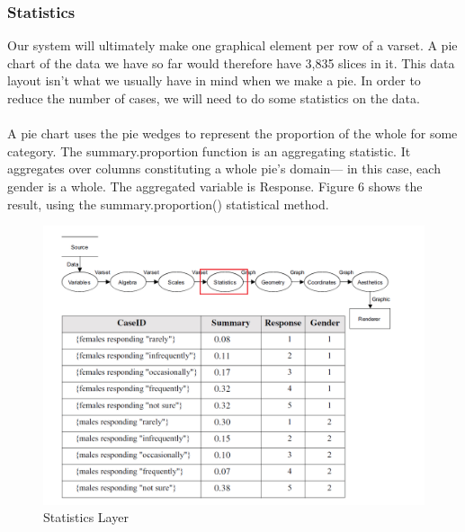 \documentclass[12pt]{article}
\begin{document}
\subsubsection{Statistics}
Our system will ultimately make one graphical element per row of a varset. A
pie chart of the data we have so far would therefore have 3,835 slices in it. This
data layout isn't what we usually have in mind when we make a pie. In order
to reduce the number of cases, we will need to do some statistics on the data. \\ \\
A pie chart uses the pie wedges to represent the proportion of the whole
for some category. The summary.proportion function is an aggregating statistic.
It aggregates over columns constituting a whole pie’s domain— in this
case, each gender is a whole. The aggregated variable is Response. Figure 6
shows the result, using the summary.proportion() statistical method.
\begin{figure}[h!]
\caption{Statistics Layer}
\includegraphics[width=\textwidth]{pic/pre4}
\end{figure}
\newpage
\end{document}

